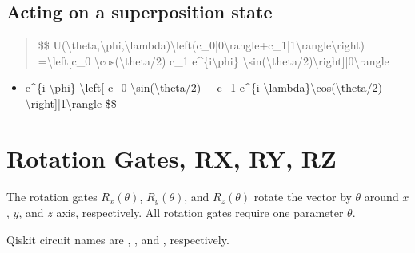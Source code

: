 \documentclass[letterpaper,10pt,english]{jupyterBook}
\begin{document}
\subsection{Acting on a superposition state}
\label{\detokenize{q1gates/u:acting-on-a-superposition-state}}\begin{quote}

\sphinxAtStartPar
\$\$
U(\textbackslash{}theta,\textbackslash{}phi,\textbackslash{}lambda)\textbackslash{}left(c\_0|0\textbackslash{}rangle+c\_1|1\textbackslash{}rangle\textbackslash{}right)
=\textbackslash{}left{[}c\_0 \textbackslash{}cos(\textbackslash{}theta/2) \sphinxhyphen{} c\_1 e\textasciicircum{}\{i\textbackslash{}phi\} \textbackslash{}sin(\textbackslash{}theta/2)\textbackslash{}right{]}|0\textbackslash{}rangle
\end{quote}
\begin{itemize}
\item {}
\sphinxAtStartPar
e\textasciicircum{}\{i \textbackslash{}phi\} \textbackslash{}left{[} c\_0 \textbackslash{}sin(\textbackslash{}theta/2) + c\_1 e\textasciicircum{}\{i \textbackslash{}lambda\}\textbackslash{}cos(\textbackslash{}theta/2) \textbackslash{}right{]}|1\textbackslash{}rangle
\$\$

\end{itemize}

\sphinxstepscope


\section{Rotation Gates, RX, RY, RZ}
\label{\detokenize{q1gates/r:rotation-gates-rx-ry-rz}}\label{\detokenize{q1gates/r:sec-rgate}}\label{\detokenize{q1gates/r::doc}}
\sphinxAtStartPar
The rotation gates \(R_x(\theta)\), \(R_y(\theta)\), and \(R_z(\theta)\) rotate the vector by \(\theta\) around \(x\), \(y\), and \(z\) axis, respectively.  All rotation gates require one parameter \(\theta\).

\sphinxAtStartPar
Qiskit circuit names are , , and , respectively.

\sphinxAtStartPar
{}
\end{document}
